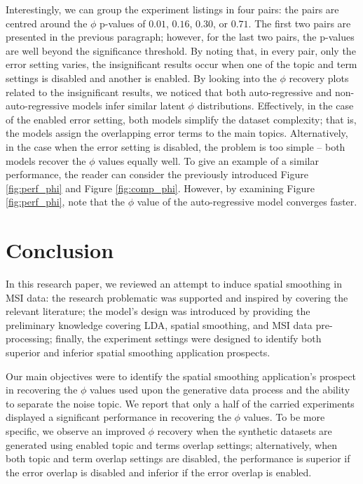 \documentclass{mpaper}
\begin{document}
\par Interestingly, we can group the experiment listings in four pairs: the pairs are centred around the $\phi$ p-values of $0.01$, $0.16$, $0.30$, or $0.71$. The first two pairs are presented in the previous paragraph; however, for the last two pairs, the p-values are well beyond the significance threshold. By noting that, in every pair, only the error setting varies, the insignificant results occur when one of the topic and term settings is disabled and another is enabled. By looking into the $\phi$ recovery plots related to the insignificant results, we noticed that both auto-regressive and non-auto-regressive models infer similar latent $\phi$ distributions. Effectively, in the case of the enabled error setting, both models simplify the dataset complexity; that is, the models assign the overlapping error terms to the main topics. Alternatively, in the case when the error setting is disabled, the problem is too simple -- both models recover the $\phi$ values equally well. To give an example of a similar performance, the reader can consider the previously introduced Figure \ref{fig:perf_phi} and Figure \ref{fig:comp_phi}. However, by examining Figure \ref{fig:perf_phi}, note that the $\phi$ value of the auto-regressive model converges faster.

\section{Conclusion}

\par In this research paper, we reviewed an attempt to induce spatial smoothing in MSI data: the research problematic was supported and inspired by covering the relevant literature; the model's design was introduced by providing the preliminary knowledge covering LDA, spatial smoothing, and MSI data pre-processing; finally, the experiment settings were designed to identify both superior and inferior spatial smoothing application prospects.

\par Our main objectives were to identify the spatial smoothing application's prospect in recovering the $\phi$ values used upon the generative data process and the ability to separate the noise topic. We report that only a half of the carried experiments displayed a significant performance in recovering the $\phi$ values. To be more specific, we observe an improved $\phi$ recovery when the synthetic datasets are generated using enabled topic and terms overlap settings; alternatively, when both topic and term overlap settings are disabled, the performance is superior if the error overlap is disabled and inferior if the error overlap is enabled.
\end{document}
